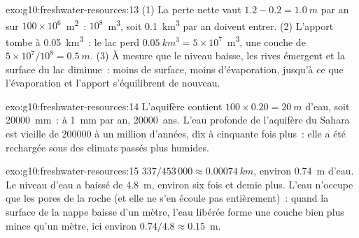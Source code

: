 \begin{solution}{exo:g10:freshwater-resources:13}
(1) La perte nette vaut $1.2 - 0.2 = \qty{1.0}{m}$ par an sur
$100 \times 10^6$~\unit{m^2}~: $10^8$~\unit{m^3}, soit \qty{0.1}{km^3} par an
doivent entrer. (2) L'apport tombe à \qty{0.05}{km^3}~: le lac perd
$\qty{0.05}{km^3} = 5 \times 10^7$~\unit{m^3}, une couche de
$5 \times 10^7/10^8 = \qty{0.5}{m}$. (3) À mesure que le niveau baisse, les
rives émergent et la surface du lac diminue~: moins de surface, moins
d'évaporation, jusqu'à ce que l'évaporation et l'apport s'équilibrent de
nouveau.
\end{solution}

\begin{solution}{exo:g10:freshwater-resources:14}
L'aquifère contient $100 \times 0.20 = \qty{20}{m}$ d'eau, soit
\qty{20000}{mm}~: à \qty{1}{mm} par an, \num{20000}~ans. L'eau profonde de
l'aquifère du Sahara est vieille de \num{200000} à un million d'années, dix
à cinquante fois plus~: elle a été rechargée sous des climats passés plus
humides.
\end{solution}

\begin{solution}{exo:g10:freshwater-resources:15}
$337/453\,000 \approx \qty{0.00074}{km}$, environ \qty{0.74}{m} d'eau. Le
niveau d'eau a baissé de \qty{4.8}{m}, environ six fois et demie plus.
L'eau n'occupe que les pores de la roche (et elle ne s'en écoule pas
entièrement)~: quand la surface de la nappe baisse d'un mètre, l'eau
libérée forme une couche bien plus mince qu'un mètre, ici environ
$0.74/4.8 \approx \num{0.15}$~m.
\end{solution}

